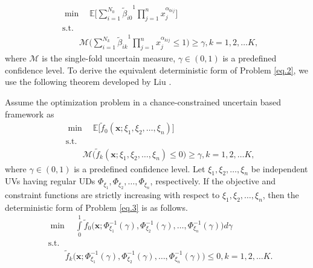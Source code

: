 \begin{equation}\label{eq.2}
	\begin{aligned}
		&	\min \quad \mathbb{E}\bigg[\sum\limits_{i=1}^{N_0}{\tilde{\beta}_{i0}}^1\prod\limits_{j=1}^{n}x_j^{\alpha_{0ij}}\bigg]\\
		&	\text{s.t.}\\
		& \qquad \mathcal{M}\bigg(\sum\limits_{i=1}^{N_k}{\tilde{\beta}_{ik}}^1\prod\limits_{j=1}^{n}x_j^{\alpha_{kij}}\leq 1\bigg)\geq \gamma,k=1,2,\ldots K,
	\end{aligned}
\end{equation} 
where $\mathcal{M}$ is the single-fold uncertain measure, $\gamma\in (0,1)$ is a predefined confidence level. To derive the equivalent deterministic form of Problem \ref{eq.2}, we use the following theorem developed by Liu \cite{Liu 2015}.
\begin{theorem}\cite{Liu 2015}\label{thm.12}
	Assume the optimization problem in a chance-constrained uncertain based framework as
\begin{equation}\label{eq.3}
	\begin{aligned}
		&	\min \quad \mathbb{E}\bigg[\tilde{f}_0{(\textbf{x};\xi_1,\xi_2,\ldots,\xi_n)}\bigg]\\
		&	\text{s.t.}\\
		& \qquad \mathcal{M}\bigg(\tilde{f}_k{(\textbf{x};\xi_1,\xi_2,\ldots,\xi_n)}\leq 0\bigg)\geq \gamma,k=1,2,\ldots K,
	\end{aligned}
\end{equation}
where $\gamma\in (0,1)$ is a predefined confidence level. Let $\xi_1,\xi_2,\ldots,\xi_n$ be independent UVs having regular UDs $\Phi_{\xi_1},\Phi_{\xi_2},\ldots,\Phi_{\xi_n}$, respectively. If the objective and constraint functions are strictly increasing with respect to $\xi_1,\xi_2,\ldots,\xi_n$, then the deterministic form of Problem \ref{eq.3} is as follows.
\begin{equation}\label{eq.4}
	\begin{aligned}
		&	\min \quad \int\limits_{0}^{1}\tilde{f}_0{\big(\textbf{x};\Phi_{\xi_1}^{-1}(\gamma),\Phi_{\xi_2}^{-1}(\gamma),\ldots,\Phi_{\xi_n}^{-1}(\gamma)\big)}d\gamma\\
		&	\text{s.t.}\\
		& \qquad \tilde{f}_k{\big(\textbf{x};\Phi_{\xi_1}^{-1}(\gamma),\Phi_{\xi_2}^{-1}(\gamma),\ldots,\Phi_{\xi_n}^{-1}(\gamma)\big)}\leq 0,k=1,2,\ldots K.
	\end{aligned}
\end{equation}
\end{theorem}
